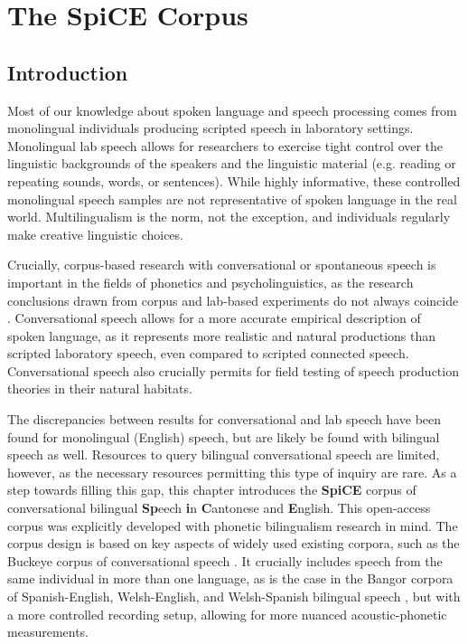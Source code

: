 
\chapter{The SpiCE Corpus}
\label{ch:Corpus}

\section{Introduction}\label{ch2:sec:introduction}
Most of our knowledge about spoken language and speech processing comes from monolingual individuals producing scripted speech in laboratory settings. Monolingual lab speech allows for researchers to exercise tight control over the linguistic backgrounds of the speakers and the linguistic material (e.g. reading or repeating sounds, words, or sentences). While highly informative, these controlled monolingual speech samples are not representative of spoken language in the real world. Multilingualism is the norm, not the exception, and individuals regularly make creative linguistic choices. 

Crucially, corpus-based research with conversational or spontaneous speech is important in the fields of phonetics and psycholinguistics, as the research conclusions drawn from corpus and lab-based experiments do not always coincide \citep{gahl_2012_reduce}. Conversational speech allows for a more accurate empirical description of spoken language, as it represents more realistic and natural productions than scripted laboratory speech, even compared to scripted connected speech. Conversational speech also crucially permits for field testing of speech production theories \citep{bell_2009_predictability, gahl_2012_reduce} in their natural habitats. 

The discrepancies between results for conversational and lab speech have been found for monolingual (English) speech, but are likely be found with bilingual speech as well. Resources to query bilingual conversational speech are limited, however, as the necessary resources permitting this type of inquiry are rare. As a step towards filling this gap, this chapter introduces the \textbf{SpiCE} corpus of conversational bilingual \textbf{Sp}eech \textbf{i}n \textbf{C}antonese and \textbf{E}nglish. This open-access corpus was explicitly developed with phonetic bilingualism research in mind. The corpus design is based on key aspects of widely used existing corpora, such as the Buckeye corpus of conversational speech \citep{pitt_2005_buckeye}. It crucially includes speech from the same individual in more than one language, as is the case in the Bangor corpora of Spanish-English, Welsh-English, and Welsh-Spanish bilingual speech \citep{deuchar_2014_corpora}, but with a more controlled recording setup, allowing for more nuanced acoustic-phonetic measurements. 

